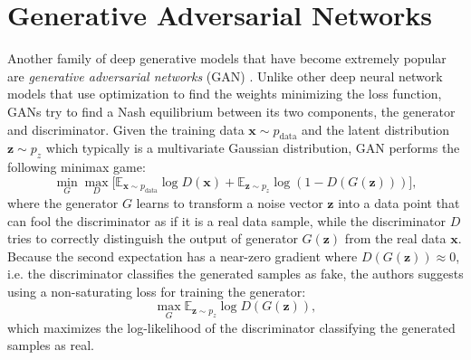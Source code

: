 \section{Generative Adversarial Networks}

Another family of deep generative models that have become extremely popular are \emph{generative adversarial networks} (GAN) \cite{goodfellow2014gan}.
Unlike other deep neural network models that use optimization to find the weights minimizing the loss function, GANs try to find a Nash equilibrium between its two components, the generator and discriminator.
Given the training data $\mathbf{x}\sim p_{\mathrm{data}}$ and the latent distribution $\mathbf{z} \sim p_z$ which typically is a multivariate Gaussian distribution, GAN performs the following minimax game:
\begin{equation}\label{eqn:gan}
	\min_{G} \max_{D} \Big[ \mathbb{E}_{\mathbf{x} \sim p_{\mathrm{data}}} {\log D(\mathbf{x})} + \mathbb{E}_{\mathbf{z} \sim p_z} \log \left ( 1 - D(G(\mathbf{z})) \right ) \Big],
\end{equation}
where the generator $G$ learns to transform a noise vector $\mathbf{z}$ into a data point that can fool the discriminator as if it is a real data sample, while the discriminator $D$ tries to correctly distinguish the output of generator $G(\mathbf{z})$ from the real data $\mathbf{x}$.
Because the second expectation has a near-zero gradient where $D(G(\mathbf{z})) \approx 0$, i.e. the discriminator classifies the generated samples as fake, the authors suggests using a non-saturating loss for training the generator:
\begin{equation}\label{eqn:nsgan}
\max_{G} \mathbb{E}_{\mathbf{z} \sim p_z} \log D(G(\mathbf{z})),
\end{equation}
which maximizes the log-likelihood of the discriminator classifying the generated samples as real.


